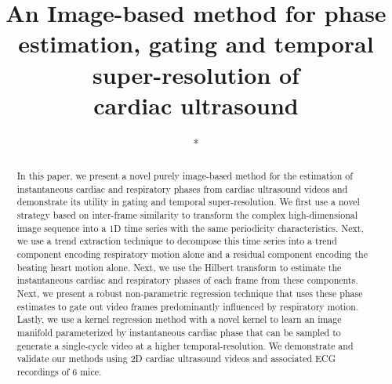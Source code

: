 \documentclass[runningheads,a4paper]{llncs}
\begin{document}
\mainmatter  %

\title{An Image-based method for phase estimation, gating and temporal super-resolution of \\cardiac ultrasound}


%
%

\author{*}
\authorrunning{*}   
\tocauthor{*}
\institute{*}

\maketitle

\begin{abstract}
In this paper, we present a novel purely image-based method for the estimation of instantaneous cardiac and respiratory phases from cardiac ultrasound videos and demonstrate its utility in gating and temporal super-resolution. We first use a novel strategy based on inter-frame similarity to transform the complex high-dimensional image sequence into a 1D time series with the same periodicity characteristics.  Next, we use a trend extraction technique to decompose this time series into a trend component encoding respiratory motion alone and a residual component encoding the beating heart motion alone. Next, we use the Hilbert transform to estimate the instantaneous cardiac and respiratory phases of each frame from these components. Next, we present a robust non-parametric regression technique that uses these phase estimates to gate out video frames predominantly influenced by respiratory motion. Lastly, we use a kernel regression method with a novel kernel to learn an image manifold parameterized by instantaneous cardiac phase that can be sampled to generate a single-cycle video at a higher temporal-resolution. We demonstrate and validate our methods using 2D cardiac ultrasound videos and associated ECG recordings of 6 mice.
\end{abstract}
%
\vspace{-0.5cm}
\end{document}
